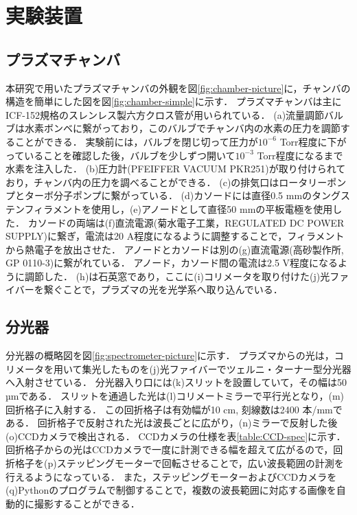 \chapter{実験装置}
\section{プラズマチャンバ}
本研究で用いたプラズマチャンバの外観を図\ref{fig:chamber-picture}に，チャンバの構造を簡単にした図を図\ref{fig:chamber-simple}に示す．
プラズマチャンバは主にICF-152規格のスレンレス製六方クロス管が用いられている．
(a)流量調節バルブは水素ボンベに繋がっており，このバルブでチャンバ内の水素の圧力を調節することができる．
実験前には，バルブを閉じ切って圧力が$10^{-6}$ Torr程度に下がっていることを確認した後，バルブを少しずつ開いて$10^{-3}$ Torr程度になるまで水素を注入した．
(b)圧力計(PFEIFFER VACUUM PKR251)が取り付けられており，チャンバ内の圧力を調べることができる．
(c)の排気口はロータリーポンプとターボ分子ポンプに繋がっている．
(d)カソードには直径0.5 mmのタングステンフィラメントを使用し，(e)アノードとして直径50 mmの平板電極を使用した．
カソードの両端は(f)直流電源(菊水電子工業，REGULATED DC POWER SUPPLY)に繋ぎ，電流は20 A程度になるように調整することで，フィラメントから熱電子を放出させた．
アノードとカソードは別の(g)直流電源(高砂製作所, GP 0110-3)に繋がれている．
アノード，カソード間の電流は2.5 V程度になるように調節した．
(h)は石英窓であり，ここに(i)コリメータを取り付けた(j)光ファイバーを繋ぐことで，プラズマの光を光学系へ取り込んでいる．

\section{分光器}
分光器の概略図を図\ref{fig:spectrometer-picture}に示す．
プラズマからの光は，コリメータを用いて集光したものを(j)光ファイバーでツェルニ・ターナー型分光器へ入射させている．
分光器入り口には(k)スリットを設置していて，その幅は50 µmである．
スリットを通過した光は(l)コリメートミラーで平行光となり，(m)回折格子に入射する．
この回折格子は有効幅が10 cm, 刻線数は2400 本/mmである．
回折格子で反射された光は波長ごとに広がり，(n)ミラーで反射した後(o)CCDカメラで検出される．
CCDカメラの仕様\cite{CCD-spec}を表\ref{table:CCD-spec}に示す．
回折格子からの光はCCDカメラで一度に計測できる幅を超えて広がるので，回折格子を(p)ステッピングモーターで回転させることで，広い波長範囲の計測を行えるようになっている．
また，ステッピングモーターおよびCCDカメラを(q)Pythonのプログラムで制御することで，複数の波長範囲に対応する画像を自動的に撮影することができる．